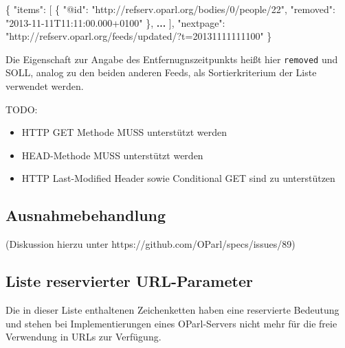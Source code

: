 \documentclass[,a4paper]{article}
\newenvironment{Shaded}{}{}
\newcommand{\DataTypeTok}[1]{\textcolor[rgb]{0.56,0.13,0.00}{{#1}}}
\newcommand{\StringTok}[1]{\textcolor[rgb]{0.25,0.44,0.63}{{#1}}}
\newcommand{\ErrorTok}[1]{\textcolor[rgb]{1.00,0.00,0.00}{\textbf{{#1}}}}
\newcommand{\NormalTok}[1]{{#1}}
\begin{document}
\begin{Shaded}
\begin{Highlighting}[]
\NormalTok{\{}
    \DataTypeTok{"items"}\NormalTok{: [}
        \NormalTok{\{}
            \DataTypeTok{"@id"}\NormalTok{: }\StringTok{"http://refserv.oparl.org/bodies/0/people/22"}\NormalTok{,}
            \DataTypeTok{"removed"}\NormalTok{: }\StringTok{"2013-11-11T11:11:00.000+0100"}
        \NormalTok{\},}
        \ErrorTok{...}
    \NormalTok{],}
    \DataTypeTok{"nextpage"}\NormalTok{: }\StringTok{"http://refserv.oparl.org/feeds/updated/?t=20131111111100"}
\NormalTok{\}}
\end{Highlighting}
\end{Shaded}

Die Eigenschaft zur Angabe des Entfernugnszeitpunkts heißt hier
\texttt{removed} und SOLL, analog zu den beiden anderen Feeds, als
Sortierkriterium der Liste verwendet werden.


TODO:

\begin{itemize}
\itemsep1pt\parskip0pt
\item
  HTTP GET Methode MUSS unterstützt werden
\item
  HEAD-Methode MUSS unterstützt werden
\item
  HTTP Last-Modified Header sowie Conditional GET sind zu unterstützen
\end{itemize}

\subsection{Ausnahmebehandlung}\label{ausnahmebehandlung}

(Diskussion hierzu unter https://github.com/OParl/specs/issues/89)

\subsection{Liste reservierter
URL-Parameter}\label{liste-reservierter-url-parameter}

Die in dieser Liste enthaltenen Zeichenketten haben eine reservierte
Bedeutung und stehen bei Implementierungen eines OParl-Servers nicht
mehr für die freie Verwendung in URLs zur Verfügung.
\end{document}
